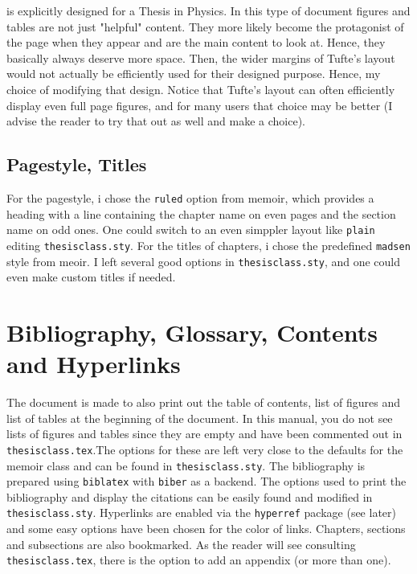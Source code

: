 is explicitly designed for a Thesis in Physics. In this type of document figures and tables are not just "helpful" content. They more likely become the protagonist of the page when they appear and are the main content to look at. Hence, they basically always deserve more space. Then, the wider margins of Tufte's layout would not actually be efficiently used for their designed purpose. Hence, my choice of modifying that design. Notice that Tufte's layout can often efficiently display even full page figures, and for many users that choice may be better (I advise the reader to try that out as well and make a choice). 

\subsection{Pagestyle, Titles}

For the pagestyle, i chose the \texttt{ruled} option from memoir, which provides a heading with a line containing the chapter name on even pages and the section name on odd ones. One could switch to an even simppler layout like \texttt{plain} editing \texttt{thesisclass.sty}. For the titles of chapters, i chose the predefined \texttt{madsen} style from meoir. I left several good options in \texttt{thesisclass.sty}, and one could even make custom titles if needed.

\section{Bibliography, Glossary, Contents and Hyperlinks}

The document is made to also print out the table of contents, list of figures and list of tables at the beginning of the document. In this manual, you do not see lists of figures and tables since they are empty and have been commented out in \texttt{thesisclass.tex}.The options for these are left very close to the defaults for the memoir class and can be found in \texttt{thesisclass.sty}. The bibliography is prepared using \texttt{biblatex} with \texttt{biber} as a backend. The options used to print the bibliography and display the citations can be easily found and modified in \texttt{thesisclass.sty}. Hyperlinks are enabled via the \texttt{hyperref} package (see later) and some easy options have been chosen for the color of links. Chapters, sections and subsections are also bookmarked. As the reader will see consulting \texttt{thesisclass.tex}, there is the option to add an appendix (or more than one). 

